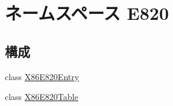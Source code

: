 \hypertarget{namespaceE820}{
\section{ネームスペース E820}
\label{namespaceE820}
}
\subsection*{構成}
\begin{DoxyCompactItemize}
\item 
class \hyperlink{classE820_1_1X86E820Entry}{X86E820Entry}
\item 
class \hyperlink{classE820_1_1X86E820Table}{X86E820Table}
\end{DoxyCompactItemize}

